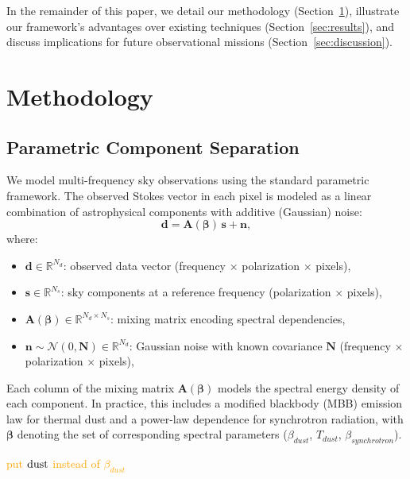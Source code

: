 \documentclass[fleqn,usenatbib]{mnras}
\newcommand{\je}[1]{\textcolor{orange}{#1}}
\begin{document}
In the remainder of this paper, we detail our methodology (Section~\ref{sec:methodology}), illustrate our framework’s advantages over existing techniques (Section~\ref{sec:results}), and discuss implications for future observational missions (Section~\ref{sec:discussion}).

\section{Methodology}
\label{sec:methodology}

\subsection{Parametric Component Separation}

We model multi-frequency sky observations using the standard parametric framework. The observed Stokes vector in each pixel is modeled as a linear combination of astrophysical components with additive (Gaussian) noise:
\begin{equation}
    \mathbf{d} = \mathbf{A}(\boldsymbol{\beta})\,\mathbf{s} + \mathbf{n},
    \label{eq:data_model}
\end{equation}
where:
\begin{itemize}
    \item \( \mathbf{d} \in \mathbb{R}^{N_d} \): observed data vector (frequency $\times$ polarization $\times$ pixels),
    \item \( \mathbf{s} \in \mathbb{R}^{N_s} \): sky components at a reference frequency (polarization $\times$ pixels),
    \item \( \mathbf{A}(\boldsymbol{\beta}) \in \mathbb{R}^{N_d \times N_s} \): mixing matrix encoding spectral dependencies,
    \item \( \mathbf{n} \sim \mathcal{N}(0, \mathbf{N}) \in \mathbb{R}^{N_d} \): Gaussian noise with known covariance \( \mathbf{N} \) (frequency $\times$ polarization $\times$ pixels),
\end{itemize}


Each column of the mixing matrix \( \mathbf{A}(\boldsymbol{\beta}) \) models the spectral energy density of each component. In practice, this includes a modified blackbody (MBB) emission law for thermal dust and a power-law dependence for synchrotron radiation, with \( \boldsymbol{\beta} \) denoting the set of corresponding spectral parameters ($\beta_{dust}$, $T_{dust}$, $\beta_{synchrotron}$). 

\je{put $\rm{dust}$ instead of $\beta_{dust}$}
\end{document}
